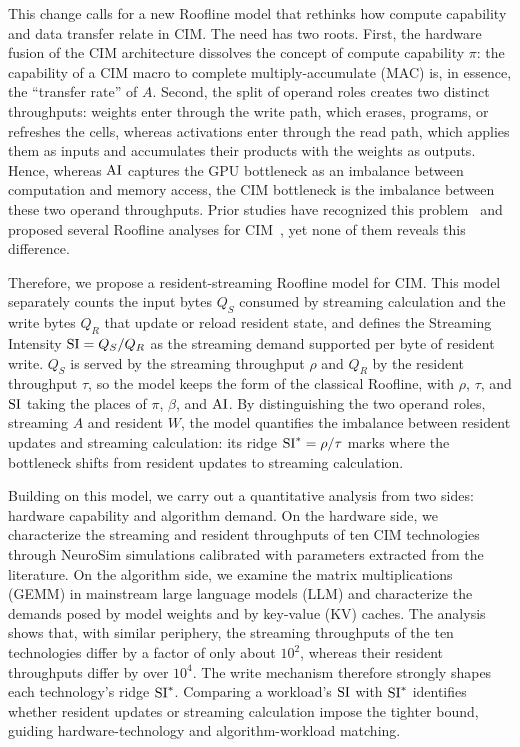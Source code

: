 
This change calls for a new Roofline model that rethinks how compute capability and data transfer relate in CIM. The need has two roots. First, the hardware fusion of the CIM architecture dissolves the concept of compute capability $\pi$: the capability of a CIM macro to complete multiply-accumulate (MAC) is, in essence, the ``transfer rate'' of $A$. Second, the split of operand roles creates two distinct throughputs: weights enter through the write path, which erases, programs, or refreshes the cells, whereas activations enter through the read path, which applies them as inputs and accumulates their products with the weights as outputs. Hence, whereas $\mathrm{AI}$ captures the GPU bottleneck as an imbalance between computation and memory access, the CIM bottleneck is the imbalance between these two operand throughputs. Prior studies have recognized this problem~\cite{jia2022imc} and proposed several Roofline analyses for CIM~\cite{krishnan2021imc_limits,garofalo2022imc_cluster,sun2023imc_benchmark,meng2024cimdla,verhelst2025roofline,sharma2025wwwtocim,zhou2025imcsim,liu2025ar_llm}, yet none of them reveals this difference.

Therefore, we propose a resident-streaming Roofline model for CIM. This model separately counts the input bytes $Q_S$ consumed by streaming calculation and the write bytes $Q_R$ that update or reload resident state, and defines the Streaming Intensity $\mathrm{SI}=Q_S/Q_R$ as the streaming demand supported per byte of resident write. $Q_S$ is served by the streaming throughput $\rho$ and $Q_R$ by the resident throughput $\tau$, so the model keeps the form of the classical Roofline, with $\rho$, $\tau$, and $\mathrm{SI}$ taking the places of $\pi$, $\beta$, and $\mathrm{AI}$. By distinguishing the two operand roles, streaming $A$ and resident $W$, the model quantifies the imbalance between resident updates and streaming calculation: its ridge $\mathrm{SI}^*=\rho/\tau$ marks where the bottleneck shifts from resident updates to streaming calculation.

Building on this model, we carry out a quantitative analysis from two sides: hardware capability and algorithm demand. On the hardware side, we characterize the streaming and resident throughputs of ten CIM technologies through NeuroSim simulations calibrated with parameters extracted from the literature. On the algorithm side, we examine the matrix multiplications (GEMM) in mainstream large language models (LLM) and characterize the demands posed by model weights and by key-value (KV) caches. The analysis shows that, with similar periphery, the streaming throughputs of the ten technologies differ by a factor of only about $10^2$, whereas their resident throughputs differ by over $10^4$. The write mechanism therefore strongly shapes each technology's ridge $\mathrm{SI}^*$. Comparing a workload's $\mathrm{SI}$ with $\mathrm{SI}^*$ identifies whether resident updates or streaming calculation impose the tighter bound, guiding hardware-technology and algorithm-workload matching.